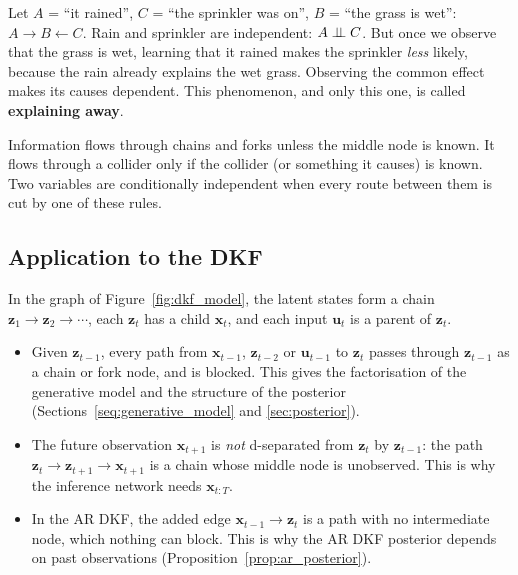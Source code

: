 Let $A$ = \enquote{it rained}, $C$ = \enquote{the sprinkler was on},
$B$ = \enquote{the grass is wet}: $A \rightarrow B \leftarrow C$. Rain
and sprinkler are independent: $A \perp\!\!\!\perp C$. But once we observe that the
grass is wet, learning that it rained makes the sprinkler \emph{less}
likely, because the rain already explains the wet grass. Observing the
common effect makes its causes dependent. This phenomenon, and only this
one, is called \textbf{explaining away}.

\begin{inwords}
Information flows through chains and forks unless the middle node is
known. It flows through a collider only if the collider (or something it
causes) is known. Two variables are conditionally independent when every
route between them is cut by one of these rules.
\end{inwords}

\subsection*{Application to the DKF}

In the graph of Figure~\ref{fig:dkf_model}, the latent states form a
chain $\mathbf{z}_1 \rightarrow \mathbf{z}_2 \rightarrow \cdots$, each
$\mathbf{z}_t$ has a child $\mathbf{x}_t$, and each input $\mathbf{u}_t$ is
a parent of $\mathbf{z}_t$.
\begin{itemize}
    \item Given $\mathbf{z}_{t-1}$, every path from $\mathbf{x}_{t-1}$,
    $\mathbf{z}_{t-2}$ or $\mathbf{u}_{t-1}$ to $\mathbf{z}_t$ passes
    through $\mathbf{z}_{t-1}$ as a chain or fork node, and is blocked.
    This gives the factorisation of the generative model and the
    structure of the posterior (Sections~\ref{seq:generative_model} and
    \ref{sec:posterior}).
    \item The future observation $\mathbf{x}_{t+1}$ is \emph{not}
    d-separated from $\mathbf{z}_t$ by $\mathbf{z}_{t-1}$: the path
    $\mathbf{z}_t \rightarrow \mathbf{z}_{t+1} \rightarrow
    \mathbf{x}_{t+1}$ is a chain whose middle node is unobserved. This is
    why the inference network needs $\mathbf{x}_{t:T}$.
    \item In the AR DKF, the added edge $\mathbf{x}_{t-1} \rightarrow
    \mathbf{z}_t$ is a path with no intermediate node, which nothing can
    block. This is why the AR DKF posterior depends on past observations
    (Proposition~\ref{prop:ar_posterior}).
\end{itemize}

